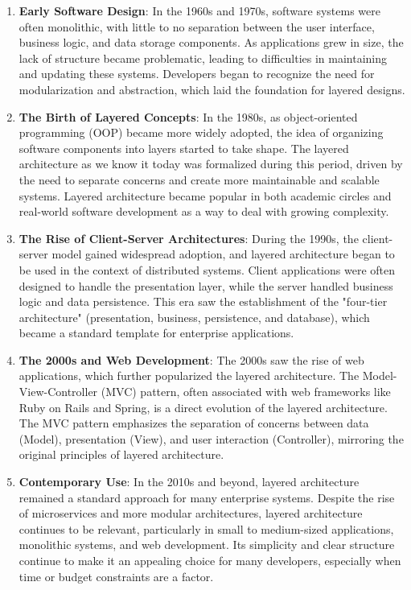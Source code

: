 \begin{enumerate}
	\item \textbf{Early Software Design}: 
	In the 1960s and 1970s, software systems were often monolithic, with little to no separation between the user interface, business logic, and data storage components. As applications grew in size, the lack of structure became problematic, leading to difficulties in maintaining and updating these systems. Developers began to recognize the need for modularization and abstraction, which laid the foundation for layered designs.
	
	\item \textbf{The Birth of Layered Concepts}: 
	In the 1980s, as object-oriented programming (OOP) became more widely adopted, the idea of organizing software components into layers started to take shape. The layered architecture as we know it today was formalized during this period, driven by the need to separate concerns and create more maintainable and scalable systems. Layered architecture became popular in both academic circles and real-world software development as a way to deal with growing complexity.
	
	\item \textbf{The Rise of Client-Server Architectures}: 
	During the 1990s, the client-server model gained widespread adoption, and layered architecture began to be used in the context of distributed systems. Client applications were often designed to handle the presentation layer, while the server handled business logic and data persistence. This era saw the establishment of the "four-tier architecture" (presentation, business, persistence, and database), which became a standard template for enterprise applications.
	
	\item \textbf{The 2000s and Web Development}: 
	The 2000s saw the rise of web applications, which further popularized the layered architecture. The Model-View-Controller (MVC) pattern, often associated with web frameworks like Ruby on Rails and Spring, is a direct evolution of the layered architecture. The MVC pattern emphasizes the separation of concerns between data (Model), presentation (View), and user interaction (Controller), mirroring the original principles of layered architecture.
	
	\item \textbf{Contemporary Use}: 
	In the 2010s and beyond, layered architecture remained a standard approach for many enterprise systems. Despite the rise of microservices and more modular architectures, layered architecture continues to be relevant, particularly in small to medium-sized applications, monolithic systems, and web development. Its simplicity and clear structure continue to make it an appealing choice for many developers, especially when time or budget constraints are a factor.
	

\end{enumerate}
